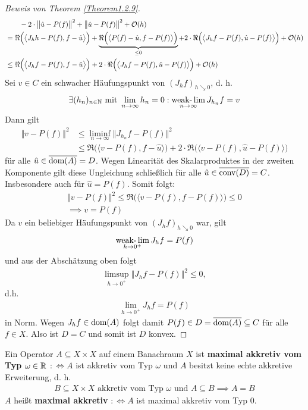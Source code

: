 \begin{proof}[Beweis von Theorem \ref{Theorem1.2.9}]
\begin{align*}
&\qquad-2\cdot\big\Vert\hat{u}-P(f)\big\Vert^2+\big\Vert\hat{u}-P(f)\big\Vert^2+\mathcal{O}(h)\\
&=\Re\Big(\big\langle J_h h-P(f),f-\hat{u}\big\rangle\Big)
+\underbrace{\Re\Big(\big\langle P(f)-\hat{u},f-P(f)\big\rangle\Big)}_{\leq0}
+2\cdot\Re\Big(\big\langle J_h f-P(f),\hat{u}-P(f)\big\rangle\Big)+\mathcal{O}(h)\\
&\leq
\Re\Big(\big\langle J_h f-P(f),f-\hat{u}\big\rangle\Big)
+2\cdot\Re\Big(\big\langle J_h f-P(f),\hat{u}-P(f)\big\rangle\Big)+\mathcal{O}(h)
\end{align*}
Sei $v\in C$ ein schwacher Häufungspunkt von $(J_h f)_{h\searrow 0}$, d. h.
\begin{align*}
\exists (h_n)_{n\in\mathbb{N}}\text{ mit } \lim\limits_{n\to\infty} h_n=0:\operatorname*{\text{weak-}\lim}\limits_{n\to\infty} J_{h_n} f=v
\end{align*}
Dann gilt
\begin{align*}
\Vert v-P(f)\Vert^2 
&\leq\liminf\limits_{n\to\infty}\big\Vert J_{h_n} f-P(f)\big\Vert^2\\
&\leq
\Re\Big(\big\langle v-P(f),f-\hat{u}\big\rangle\Big)
+2\cdot\Re\Big(\big\langle v-P(f),\hat{u}-P(f)\big\rangle\Big)
\end{align*}
für alle $\hat{u}\in\overline{\text{dom}(A)}=D$.
Wegen Linearität des Skalarproduktes in der zweiten Komponente gilt diese Ungleichung schließlich für alle $\hat{u}\in\overline{\text{conv}(D)}=C$. Insbesondere auch für $\hat{u}=P(f)$. Somit folgt:
\begin{align*}
\big\Vert v-P(f)\big\Vert^2
\leq
\Re\Big(\big\langle v-P(f),f-P(f)\big\rangle\Big)
\leq0\\
\implies
v=P(f)
\end{align*}
Da $v$ ein beliebiger Häufungspunkt von $(J_h f)_{h\searrow 0}$ war, gilt 
\begin{align*}
\operatorname*{\text{weak-}\lim}\limits_{h\to0^+} J_h f=P(f)
\end{align*}
und aus der Abschätzung oben folgt 
\begin{align*}
\limsup\limits_{h\to 0^+}\big\Vert J_h f-P(f)\big\Vert^2
\leq
0,
\end{align*}
d.h. 
\begin{align*}
\lim\limits_{h\to 0^+} J_h f=P(f)
\end{align*}
in Norm. Wegen $J_h f\in\text{dom}(A)$ folgt damit $P(f)\in D=\overline{\text{dom}(A)}\subseteq C$ für alle $f\in X$. Also ist $D=C$ und somit ist $D$ konvex.
\end{proof}

\begin{definition}
Ein Operator $A\subseteq X\times X$ auf einem Banachraum $X$ ist \textbf{maximal akkretiv vom Typ $\omega\in\mathbb{R}$} $:\Longleftrightarrow A$ ist akkretiv vom Typ $\omega$ und $A$ besitzt keine echte akkretive Erweiterung, d. h.
\begin{align*}
B\subseteq X\times X\text{ akkretiv vom Typ $\omega$ und }A\subseteq B
\implies A=B
\end{align*}
$A$ heißt \textbf{maximal akkretiv} $:\Longleftrightarrow A$ ist maximal akkretiv vom Typ 0.
\end{definition}

